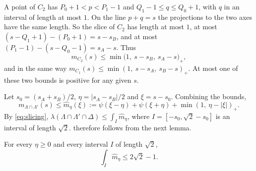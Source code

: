 A point of $C_2$ has $P_0+1<p<P_1-1$ and $Q_1-1\le q\le Q_0+1$, with $q$ in an interval of length at most $1$. On the line $p+q=s$ the projections to the two axes have the same length. So the slice of $C_2$ has length at most $1$, at most $(s-Q_1+1)-(P_0+1)=s-s_B$, and at most $(P_1-1)-(s-Q_0-1)=s_A-s$. Thus
\[
m_{C_2}(s)\le\min\big(1,\ s-s_B,\ s_A-s\big)_+ ,
\]
and in the same way $m_{C_1}(s)\le\min(1,\ s-s_A,\ s_B-s)_+$. At most one of these two bounds is positive for any given $s$.

Let $s_0=(s_A+s_B)/2$, $\eta=|s_A-s_B|/2$ and $\xi=s-s_0$. Combining the bounds,
\begin{equation}\label{eq:mhat}
m_{\Lambda\cap\Lambda'}(s)\le\widehat m_\eta(\xi):=\psi(\xi-\eta)+\psi(\xi+\eta)+\min(1,\ \eta-|\xi|)_+ .
\end{equation}
By \eqref{eq:slicing}, $\lambda(\Lambda\cap\Lambda'\cap\Delta)\le\int_I\widehat m_\eta$, where $I=[-s_0,\sqrt2-s_0]$ is an interval of length $\sqrt2$.  therefore follows from the next lemma.

\begin{lem}\label{lem:Z}
For every $\eta\ge0$ and every interval $I$ of length $\sqrt2$,
\[
\int_I\widehat m_\eta\le2\sqrt2-1 .
\]
\end{lem}

